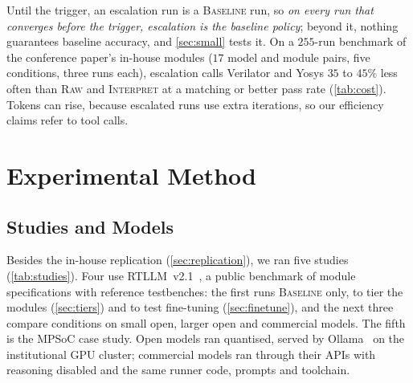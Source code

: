 \documentclass[11pt]{article}
\newcommand{\cname}[1]{\textsc{#1}}
\newcommand{\Base}{\cname{Baseline}}
\newcommand{\Raw}{\cname{Raw}}
\newcommand{\Interp}{\cname{Interpret}}
\begin{document}
Until the trigger, an escalation run is a \Base{} run, so \emph{on every run that
converges before the trigger, escalation is the baseline policy}; beyond it,
nothing guarantees baseline accuracy, and \cref{sec:small} tests it. On a
$255$-run benchmark of the conference paper's in-house modules ($17$ model and
module pairs, five conditions, three runs each), escalation calls Verilator and
Yosys $35$ to $45\%$ less often than \Raw{} and \Interp{} at a matching or
better pass rate (\cref{tab:cost}). Tokens can rise, because escalated runs use
extra iterations, so our efficiency claims refer to tool calls.

\section{Experimental Method}
\label{sec:method}

\subsection{Studies and Models}
\label{sec:studies}

Besides the in-house replication (\cref{sec:replication}), we ran five studies
(\cref{tab:studies}). Four use RTLLM~v2.1~\cite{lu2024rtllm}, a public benchmark
of module specifications with reference testbenches: the first runs \Base{}
only, to tier the modules (\cref{sec:tiers}) and to test fine-tuning
(\cref{sec:finetune}), and the next three compare conditions on small open,
larger open and commercial models. The fifth is the MPSoC case study. Open
models ran quantised, served by Ollama~\cite{ollama} on the institutional GPU
cluster; commercial models ran through their APIs with reasoning disabled and
the same runner code, prompts and toolchain.
\end{document}
